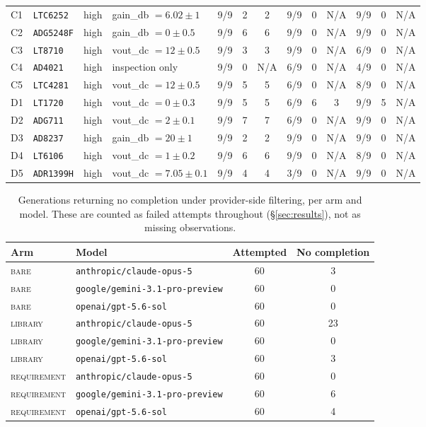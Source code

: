\begin{table}[!ht]
\begin{tabular}{@{}llll ccc ccc ccc@{}}
C1 & \texttt{LTC6252} & high & gain\_db $= 6.02 \pm 1$ & 9/9 & 2 & 2 & 9/9 & 0 & N/A & 9/9 & 0 & N/A \\
C2 & \texttt{ADG5248F} & high & gain\_db $= 0 \pm 0.5$ & 9/9 & 6 & 6 & 9/9 & 0 & N/A & 9/9 & 0 & N/A \\
C3 & \texttt{LT8710} & high & vout\_dc $= 12 \pm 0.5$ & 9/9 & 3 & 3 & 9/9 & 0 & N/A & 6/9 & 0 & N/A \\
C4 & \texttt{AD4021} & high & inspection only & 9/9 & 0 & N/A & 6/9 & 0 & N/A & 4/9 & 0 & N/A \\
C5 & \texttt{LTC4281} & high & vout\_dc $= 12 \pm 0.5$ & 9/9 & 5 & 5 & 6/9 & 0 & N/A & 8/9 & 0 & N/A \\
D1 & \texttt{LT1720} & high & vout\_dc $= 0 \pm 0.3$ & 9/9 & 5 & 5 & 6/9 & 6 & 3 & 9/9 & 5 & N/A \\
D2 & \texttt{ADG711} & high & vout\_dc $= 2 \pm 0.1$ & 9/9 & 7 & 7 & 6/9 & 0 & N/A & 9/9 & 0 & N/A \\
D3 & \texttt{AD8237} & high & gain\_db $= 20 \pm 1$ & 9/9 & 2 & 2 & 9/9 & 0 & N/A & 9/9 & 0 & N/A \\
D4 & \texttt{LT6106} & high & vout\_dc $= 1 \pm 0.2$ & 9/9 & 6 & 6 & 9/9 & 0 & N/A & 8/9 & 0 & N/A \\
D5 & \texttt{ADR1399H} & high & vout\_dc $= 7.05 \pm 0.1$ & 9/9 & 4 & 4 & 3/9 & 0 & N/A & 9/9 & 0 & N/A \\
\bottomrule
\end{tabular}
\end{table}

\begin{table}[!ht]
\centering
\caption{Generations returning no completion under provider-side filtering,
  per arm and model. These are counted as failed attempts throughout
  (\S\ref{sec:results}), not as missing observations.}
\label{tab:nocomp}
\small
\begin{tabular}{@{}llcc@{}}
\toprule
\textbf{Arm} & \textbf{Model} & \textbf{Attempted} & \textbf{No completion} \\
\midrule
\textsc{bare} & \texttt{anthropic/claude-opus-5} & 60 & 3 \\
\textsc{bare} & \texttt{google/gemini-3.1-pro-preview} & 60 & 0 \\
\textsc{bare} & \texttt{openai/gpt-5.6-sol} & 60 & 0 \\
\textsc{library} & \texttt{anthropic/claude-opus-5} & 60 & 23 \\
\textsc{library} & \texttt{google/gemini-3.1-pro-preview} & 60 & 0 \\
\textsc{library} & \texttt{openai/gpt-5.6-sol} & 60 & 3 \\
\textsc{requirement} & \texttt{anthropic/claude-opus-5} & 60 & 0 \\
\textsc{requirement} & \texttt{google/gemini-3.1-pro-preview} & 60 & 6 \\
\textsc{requirement} & \texttt{openai/gpt-5.6-sol} & 60 & 4 \\
\bottomrule
\end{tabular}
\end{table}


